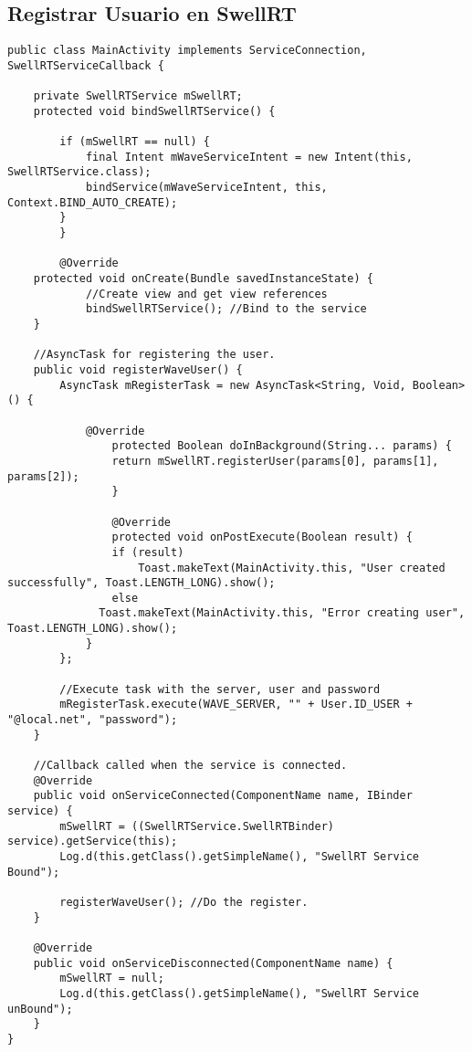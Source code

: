 \subsection{Registrar Usuario en SwellRT} \label{ssec:waveRegister}

	  \begin{lstlisting}[frame=single]	  
public class MainActivity implements ServiceConnection, SwellRTServiceCallback {
	  
	private SwellRTService mSwellRT;	  	  
	protected void bindSwellRTService() {

        if (mSwellRT == null) {
            final Intent mWaveServiceIntent = new Intent(this, SwellRTService.class);
            bindService(mWaveServiceIntent, this, Context.BIND_AUTO_CREATE);
        }
    	}
   		
    	@Override
    protected void onCreate(Bundle savedInstanceState) {
    		//Create view and get view references    		
    		bindSwellRTService(); //Bind to the service  		
    }
    
    //AsyncTask for registering the user.
    public void registerWaveUser() {
        AsyncTask mRegisterTask = new AsyncTask<String, Void, Boolean>() {

       		@Override
        		protected Boolean doInBackground(String... params) {
           		return mSwellRT.registerUser(params[0], params[1], params[2]);
        		}

        		@Override
        		protected void onPostExecute(Boolean result) {
          		if (result)
              		Toast.makeText(MainActivity.this, "User created successfully", Toast.LENGTH_LONG).show();
           		else
              Toast.makeText(MainActivity.this, "Error creating user", Toast.LENGTH_LONG).show();
            }
        };
		
		//Execute task with the server, user and password
        mRegisterTask.execute(WAVE_SERVER, "" + User.ID_USER + "@local.net", "password");
    }

	//Callback called when the service is connected.
    @Override
    public void onServiceConnected(ComponentName name, IBinder service) {
        mSwellRT = ((SwellRTService.SwellRTBinder) service).getService(this);
        Log.d(this.getClass().getSimpleName(), "SwellRT Service Bound");
        
        registerWaveUser(); //Do the register.
    }

    @Override
    public void onServiceDisconnected(ComponentName name) {
        mSwellRT = null;
        Log.d(this.getClass().getSimpleName(), "SwellRT Service unBound");
	}	   
}
	  \end{lstlisting}
	  
